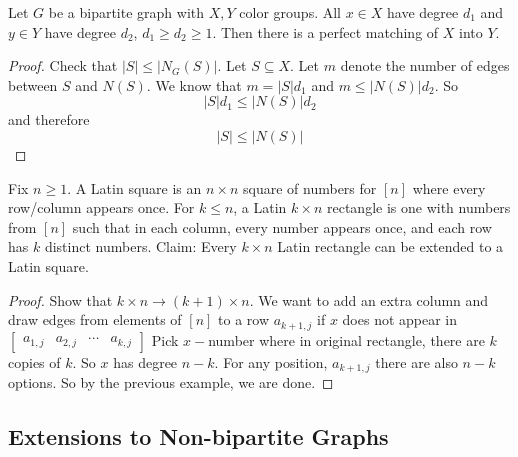 \documentclass{report}
\begin{document}
\begin{examples}
    \begin{example}
        Let $G$ be a bipartite graph with $X, Y$ color groups. All $x \in X$ have degree $d_{1}$ and $y \in Y$ have degree $d_{2}$, $d_{1} \geq d_{2} \geq 1$. Then there is a perfect matching of $X$ into $Y$.
            \begin{proof}
                Check that $\lvert S \rvert \leq \lvert N_{G}(S) \rvert$. Let $S \subseteq X$. Let $m$ denote the number of edges between $S$ and $N(S)$. We know that $m = \lvert S \rvert d_{1}$ and $m \leq \lvert N(S) \rvert d_{2}$. So
                    \begin{equation*}
                        \lvert S \rvert d_{1} \leq \lvert N(S) \rvert d_{2}
                    \end{equation*}
                and therefore
                    \begin{equation*}
                        \lvert S \rvert \leq \lvert N(S) \rvert
                    \end{equation*}
            \end{proof}
    \end{example}
    \begin{example}
        Fix $n \geq 1$. A Latin square is an $n \times n$ square of numbers for $[n]$ where every row/column appears once. For $k \leq n$, a Latin $k \times n$ rectangle is one with numbers from $[n]$ such that in each column, every number appears once, and each row has $k$ distinct numbers. Claim: Every $k \times n$ Latin rectangle can be extended to a Latin square.
            \begin{proof}
                Show that $k \times n \rightarrow (k + 1) \times n$. We want to add an extra column and draw edges from elements of $[n]$ to a row $a_{k + 1, j}$ if $x$ does not appear in $\begin{bmatrix}
                    a_{1, j} & a_{2, j} & \cdots &  a_{k, j}   
                \end{bmatrix}$ Pick $x-$number where in original rectangle, there are $k$ copies of $k$. So $x$ has degree $n - k$. For any position, $a_{k + 1, j}$ there are also $n - k$ options. So by the previous example, we are done.
            \end{proof}
    \end{example}
\end{examples}

\begin{topic}
    \section{Extensions to Non-bipartite Graphs}
\end{topic}
\end{document}
